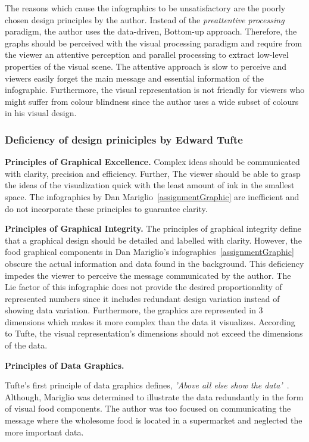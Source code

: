 The reasons which cause the infographics to be unsatisfactory are the poorly
chosen design principles by the author. Instead of the \textit{preattentive
processing} paradigm, the author uses the data-driven, Bottom-up approach.
Therefore, the graphs should be perceived with the visual processing paradigm
and require from the viewer an attentive perception and parallel processing to
extract low-level properties of the visual scene. The attentive approach is slow
to perceive and viewers easily forget the main message and essential information
of the infographic. Furthermore, the visual representation is not friendly for
viewers who might suffer from colour blindness since the author uses a wide
subset of colours in his visual design.

\subsubsection{Deficiency of design priniciples by Edward Tufte}

\textbf{Principles of Graphical Excellence.} Complex ideas should be
communicated with clarity, precision and efficiency. Further, The viewer should
be able to grasp the ideas of the visualization quick with the least amount of
ink in the smallest space. The infographics by Dan
Mariglio~\ref{assignmentGraphic} are inefficient and do not incorporate these
principles to guarantee clarity.

\textbf{Principles of Graphical Integrity.} The principles of graphical
integrity define that a graphical design should be detailed and labelled with
clarity. However, the food graphical components in Dan Mariglio's
infographics~\ref{assignmentGraphic} obscure the actual information and data
found in the background. This deficiency impedes the viewer to perceive the
message communicated by the author. The Lie factor of this infographic does not
provide the desired proportionality of represented numbers since it includes
redundant design variation instead of showing data variation. Furthermore, the
graphics are represented in 3 dimensions which makes it more complex than the
data it visualizes. According to Tufte, the visual representation's dimensions
should not exceed the dimensions of the data. 

\textbf{Principles of Data Graphics.}

Tufte's first principle of data graphics defines, \textit{'Above all else show
the data'}~\cite{Tufte2001}. Although, Mariglio was determined to illustrate the
data redundantly in the form of visual food components. The author was too
focused on communicating the message where the wholesome food is located in a
supermarket and neglected the more important data.

